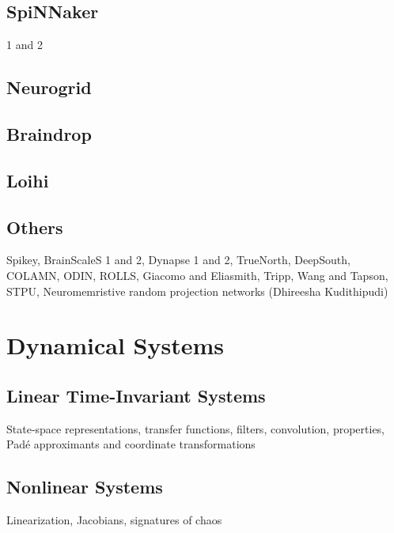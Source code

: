 \subsection{SpiNNaker}

1 and 2

\subsection{Neurogrid}

\subsection{Braindrop}

\subsection{Loihi}

\subsection{Others}

Spikey, BrainScaleS 1 and 2, Dynapse 1 and 2, TrueNorth, DeepSouth, COLAMN, ODIN, ROLLS, Giacomo and Eliasmith, Tripp, Wang and Tapson, STPU, Neuromemristive random projection networks (Dhireesha Kudithipudi)


\section{Dynamical Systems}

\subsection{Linear Time-Invariant Systems}

State-space representations, transfer functions, filters, convolution, properties, Pad\'e approximants and coordinate transformations

\subsection{Nonlinear Systems}

Linearization, Jacobians, signatures of chaos

